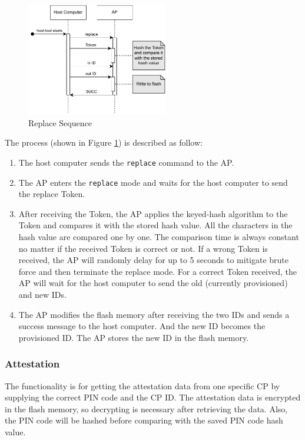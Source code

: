 \documentclass[11pt,oneside,onecolumn,letterpaper]{article}
\newcounter{alg}
\begin{document}
	\begin{figure}[h]
		\centering
		\includegraphics[width=0.55\textwidth]{pics/replace.pdf}
		\caption{Replace Sequence}
		\label{fig:functionality_replace}
	\end{figure}
	
	The process (shown in Figure \ref{fig:functionality_replace}) is described as follow:
	
	\begin{enumerate}
		\item The host computer sends the \texttt{replace} command to the AP.
		\item The AP enters the \texttt{replace} mode and waits for the host computer to send the replace Token.
		\item After receiving the Token,
		the AP applies the keyed-hash algorithm to the Token and compares it with the stored hash value.
		All the characters in the hash value are compared one by one.
		The comparison time is always constant no matter if the received Token is correct or not.
		If a wrong Token is received,
		the AP will randomly delay for up to 5 seconds to mitigate brute force and then terminate the replace mode.
		For a correct Token received,
		the AP will wait for the host computer to send the old (currently provisioned) and new IDs.
		\item The AP modifies the flash memory after receiving the two IDs and sends a success message to the host computer.
		And the new ID becomes the provisioned ID.
		The AP stores the new ID in the flash memory.
	\end{enumerate}
	
	\subsubsection{Attestation}
	The functionality is for getting the attestation data from one specific CP by supplying the correct PIN code and the CP ID.
	The attestation data is encrypted in the flash memory,
	so decrypting is necessary after retrieving the data.
	Also,
	the PIN code will be hashed before comparing with the saved PIN code hash value.
	
\end{document}
